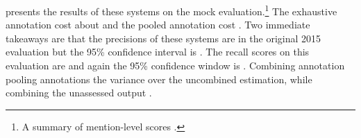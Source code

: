  presents the results of these systems on the mock evaluation.\footnote{
A summary of mention-level scores .}  
The exhaustive annotation cost about  and the pooled annotation cost .
Two immediate takeaways are that the precisions of these systems are  in the original 2015 evaluation but the 95\% confidence interval is .
The recall scores on this evaluation are  and again the 95\% confidence window is .
Combining annotation pooling annotations  the variance over the uncombined estimation,
while combining the unassessed output .

